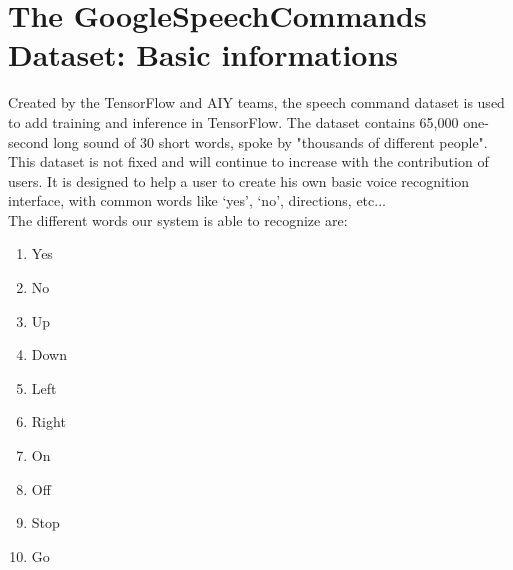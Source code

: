 \documentclass[11pt,a4paper,titlepage]{report}
\begin{document}
\section{The GoogleSpeechCommands Dataset: Basic informations}
\label{sec:google}
\hspace*{0.6cm}
Created by the TensorFlow and AIY teams, the speech command dataset is used to add training and inference in TensorFlow. The dataset contains 65,000 one-second long sound of 30 short words, spoke by "thousands of different people". This dataset is not fixed and will continue to increase with the contribution of users. It is designed to help a user to create his own basic voice recognition interface, with common words like `yes', `no', directions, etc...\\
The different words our system is able to recognize are:

\begin{enumerate}
	\item Yes
	\item No
	\item Up
	\item Down
	\item Left
	\item Right
	\item On
	\item Off
	\item Stop
	\item Go
\end{enumerate}
\end{document}
